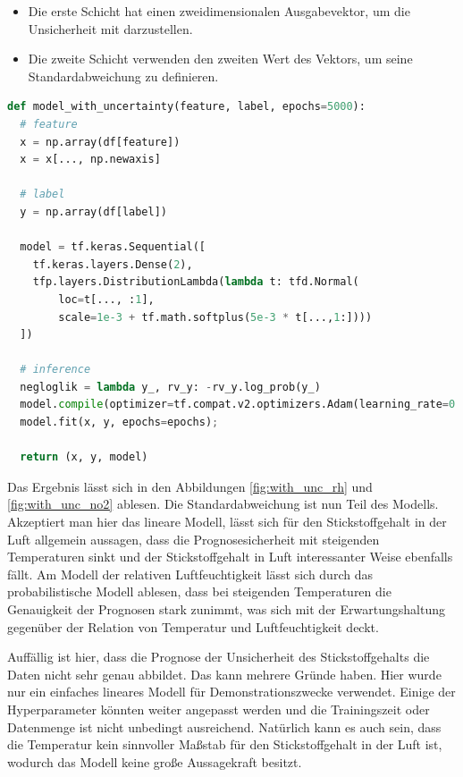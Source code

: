 \documentclass[12pt]{article}
\begin{document}
\begin{itemize}
  \item Die erste Schicht hat einen zweidimensionalen Ausgabevektor, um die Unsicherheit mit darzustellen.
  \item Die zweite Schicht verwenden den zweiten Wert des Vektors, um seine Standardabweichung zu definieren. 
\end{itemize}

\begin{lstlisting}[language=Python, caption={Modell mit Keras mit Unsicherheit}, label={lst:model_with_uncertainty}]
def model_with_uncertainty(feature, label, epochs=5000):
  # feature
  x = np.array(df[feature])
  x = x[..., np.newaxis]

  # label
  y = np.array(df[label])
  
  model = tf.keras.Sequential([
    tf.keras.layers.Dense(2),
    tfp.layers.DistributionLambda(lambda t: tfd.Normal(
        loc=t[..., :1],
        scale=1e-3 + tf.math.softplus(5e-3 * t[...,1:])))
  ])

  # inference
  negloglik = lambda y_, rv_y: -rv_y.log_prob(y_)
  model.compile(optimizer=tf.compat.v2.optimizers.Adam(learning_rate=0.01), loss=negloglik)
  model.fit(x, y, epochs=epochs);

  return (x, y, model)
\end{lstlisting}

Das Ergebnis lässt sich in den Abbildungen \ref{fig:with_unc_rh} und \ref{fig:with_unc_no2} ablesen. Die Standardabweichung ist nun Teil des Modells. Akzeptiert man hier das lineare Modell, lässt sich für den Stickstoffgehalt in der Luft allgemein aussagen, dass die Prognosesicherheit mit steigenden Temperaturen sinkt und der Stickstoffgehalt in Luft interessanter Weise ebenfalls fällt. Am Modell der relativen Luftfeuchtigkeit  lässt sich durch das probabilistische Modell ablesen, dass bei steigenden Temperaturen die Genauigkeit der Prognosen stark zunimmt, was sich mit der Erwartungshaltung gegenüber der Relation von Temperatur und Luftfeuchtigkeit deckt.

Auffällig ist hier, dass die Prognose der Unsicherheit des Stickstoffgehalts die Daten nicht sehr genau abbildet. Das kann mehrere Gründe haben. Hier wurde nur ein einfaches lineares Modell für Demonstrationszwecke verwendet. Einige der Hyperparameter könnten weiter angepasst werden und die Trainingszeit oder Datenmenge ist nicht unbedingt ausreichend. Natürlich kann es auch sein, dass die Temperatur kein sinnvoller Maßstab für den Stickstoffgehalt in der Luft ist, wodurch das Modell keine große Aussagekraft besitzt. 
\end{document}
